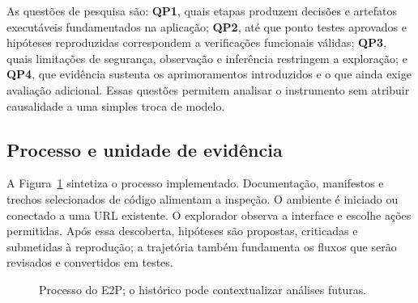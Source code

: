 \documentclass[12pt]{article}
\begin{document}
As questões de pesquisa são: \textbf{QP1}, quais etapas produzem decisões e artefatos executáveis fundamentados na aplicação; \textbf{QP2}, até que ponto testes aprovados e hipóteses reproduzidas correspondem a verificações funcionais válidas; \textbf{QP3}, quais limitações de segurança, observação e inferência restringem a exploração; e \textbf{QP4}, que evidência sustenta os aprimoramentos introduzidos e o que ainda exige avaliação adicional. Essas questões permitem analisar o instrumento sem atribuir causalidade a uma simples troca de modelo.

\subsection{Processo e unidade de evidência}
A Figura~\ref{fig:pipeline} sintetiza o processo implementado. Documentação, manifestos e trechos selecionados de código alimentam a inspeção. O ambiente é iniciado ou conectado a uma URL existente. O explorador observa a interface e escolhe ações permitidas. Após essa descoberta, hipóteses são propostas, criticadas e submetidas à reprodução; a trajetória também fundamenta os fluxos que serão revisados e convertidos em testes.

\begin{figure}[ht]
\centering
{}
\caption{Processo do E2P; o histórico pode contextualizar análises futuras.}
\label{fig:pipeline}
\end{figure}
\end{document}
